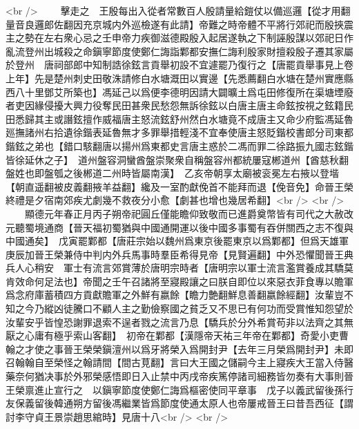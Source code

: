 <br />
　　擊走之　王殷每出入從者常數百人殷請量給鎧仗以備巡邏【從才用翻量音良邏郎佐翻因充京城内外巡檢遂有此請】帝難之時帝體不平將行郊祀而殷挾震主之勢在左右衆心忌之壬申帝力疾御滋德殿殷入起居遂執之下制誣殷謀以郊祀日作亂流登州出城殺之命鎭寧節度使鄭仁誨詣鄴都安撫仁誨利殷家財擅殺殷子遷其家屬於登州　唐祠部郎中知制誥徐鉉言貢舉初設不宜遽罷乃復行之【唐罷貢舉事見上卷上年】先是楚州刺史田敬洙請修白水塘溉田以實邊【先悉薦翻白水塘在楚州實應縣西八十里鄧艾所築也】馮延己以爲便李德明因請大闢曠土爲屯田修復所在渠塘堙廢者吏因緣侵擾大興力役奪民田甚衆民愁怨無訴徐鉉以白唐主唐主命鉉按視之鉉籍民田悉歸其主或譖鉉擅作威福唐主怒流鉉舒州然白水塘竟不成唐主又命少府監馮延魯廵撫諸州右拾遺徐鍇表延魯無才多罪舉措輕淺不宜奉使唐主怒貶鍇校書郎分司東都鍇鉉之弟也【錯口駭翻唐以揚州爲東都史言唐主惑於二馮而罪二徐路振九國志鉉鍇皆徐延休之子】　道州盤容洞蠻酋盤崇聚衆自稱盤容州都統屢寇郴道州【酋慈秋翻盤姓也即盤瓠之後郴道二州時皆屬南漢】　乙亥帝朝享太廟被衮冕左右掖以登堦【朝直遥翻被皮義翻掖羊益翻】纔及一室酌獻俛首不能拜而退【俛音免】命晉王榮終禮是夕宿南郊疾尤劇幾不救夜分小愈【劇甚也增也幾居希翻】<br />
<br />
　　顯德元年春正月丙子朔帝祀圓丘僅能瞻仰致敬而已進爵奠幣皆有司代之大赦改元聽蜀境通商【晉天福初蜀猶與中國通開運以後中國多事蜀有吞併關西之志不復與中國通矣】　戊寅罷鄴都【唐莊宗始以魏州爲東京後罷東京以爲鄴都】但爲天雄軍　庚辰加晉王榮兼侍中判内外兵馬事時羣臣希得見帝【見賢遍翻】中外恐懼聞晉王典兵人心稍安　軍士有流言郊賞薄於唐明宗時者【唐明宗以軍士流言濫賞養成其驕莫肯效命何足法也】帝聞之壬午召諸將至寢殿讓之曰朕自即位以來惡衣菲食專以贍軍爲念府庫蓄積四方貢獻贍軍之外鮮有嬴餘【瞻力艶翻鮮息善翻嬴餘經翻】汝輩豈不知之今乃縱凶徒騰口不顧人主之勤儉察國之貧乏又不思已有何功而受賞惟知怨望於汝輩安乎皆惶恐謝罪退索不逞者戮之流言乃息【驕兵於分外希賞苟非以法齊之其無厭之心庸有極乎索山客翻】　初帝在鄴都【漢隱帝天祐三年帝在鄴都】奇愛小吏曹翰之才使之事晉王榮榮鎭澶州以爲牙將榮入爲開封尹【去年三月榮爲開封尹】未即召翰翰自至榮怪之翰請間【間古莧翻】言曰大王國之儲嗣今主上寢疾大王當入侍醫藥奈何猶决事於外邪榮感悟即日入止禁中丙戌帝疾篤停諸司細務皆勿奏有大事則晉王榮禀進止宣行之　以鎭寧節度使鄭仁誨爲樞密使同平章事　戊子以義武留後孫行友保義留後韓通朔方留後馮繼業皆爲節度使通太原人也帝屢戒晉王曰昔吾西征【謂討李守貞王景崇趙思綰時】見唐十八<br />
<br />
